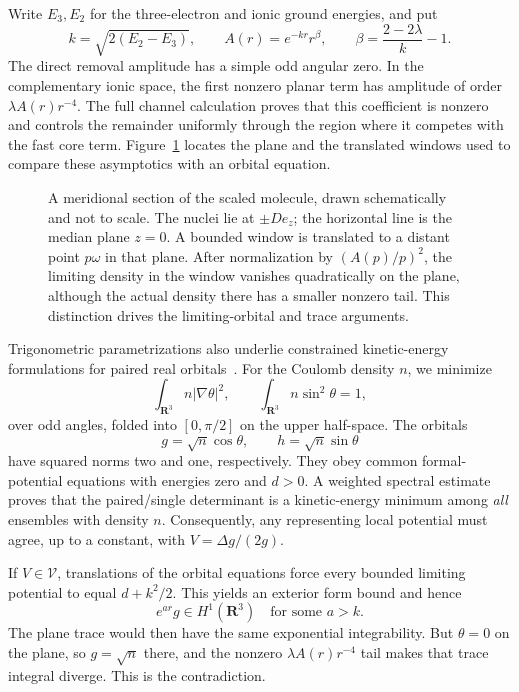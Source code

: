 \documentclass[11pt,a4paper]{article}
\newcommand{\R}{\mathbf R}
\theoremstyle{definition}
\theoremstyle{remark}
\numberwithin{equation}{section}
\begin{document}
Write \(E_3,E_2\) for the three-electron and ionic ground energies,
and put
\[
k=\sqrt{2(E_2-E_3)},\qquad A(r)=e^{-kr}r^\beta,
\qquad \beta=\frac{2-2\lambda}{k}-1.
\]
The direct removal amplitude has a simple odd angular zero.
In the complementary ionic space, the first nonzero planar term
has amplitude of order \(\lambda A(r)r^{-4}\).
The full channel calculation proves that this coefficient is
nonzero and controls the remainder uniformly through the region
where it competes with the fast core term.
Figure~\ref{fig:median-plane} locates the plane and the translated
windows used to compare these asymptotics with an orbital equation.

\begin{figure}[htbp]
\centering

\caption{A meridional section of the scaled molecule, drawn
schematically and not to scale. The nuclei lie at \(\pm De_z\);
the horizontal line is the median plane \(z=0\). A bounded window
is translated to a distant point \(p\omega\) in that plane.
After normalization by \((A(p)/p)^2\), the limiting density in
the window vanishes quadratically on the plane, although the
actual density there has a smaller nonzero tail. This distinction
drives the limiting-orbital and trace arguments.}
\label{fig:median-plane}
\end{figure}

Trigonometric parametrizations also underlie constrained kinetic-energy
formulations for paired real orbitals~\cite[Section~3.3]{KR25}.
For the Coulomb density \(n\), we minimize
\[
\int_{\R^3}n|\nabla\theta|^2,\qquad
\int_{\R^3}n\sin^2\theta=1,
\]
over odd angles, folded into \([0,\pi/2]\) on the upper half-space.
The orbitals
\[
g=\sqrt n\cos\theta,\qquad h=\sqrt n\sin\theta
\]
have squared norms two and one, respectively. They obey common
formal-potential equations with energies zero and \(d>0\).
A weighted spectral estimate proves that the paired/single
determinant is a kinetic-energy minimum among \emph{all} ensembles
with density \(n\). Consequently, any representing local potential
must agree, up to a constant, with \(V=\Delta g/(2g)\).

If \(V\in\mathcal V\), translations of the orbital equations
force every bounded limiting potential to equal \(d+k^2/2\).
This yields an exterior form bound and hence
\[
e^{ar}g\in H^1(\R^3)
\quad\text{for some }a>k.
\]
The plane trace would then have the same exponential integrability.
But \(\theta=0\) on the plane, so \(g=\sqrt n\) there, and the
nonzero \(\lambda A(r)r^{-4}\) tail makes that trace integral
diverge. This is the contradiction.
\end{document}
